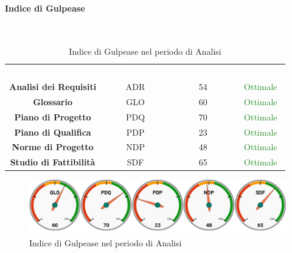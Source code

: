 \paragraph{Indice di Gulpease}\mbox{}\\[0,3cm]
\begin{table}[H]
	\centering
	\begin{tabular}{cccc}
	\rowcolor{greySWEight}
	\textcolor{white}{\textbf{Documento}} & 
	\textcolor{white}{\textbf{Abbreviazione}} &
	\textcolor{white}{\textbf{Valore Indice}}&
	\textcolor{white}{\textbf{Riscontro}}\\
	
	\textbf{Analisi dei Requisiti} &
	ADR & 
	54 &
	\textcolor{ForestGreen}{Ottimale}
	\\
	\textbf{Glossario} &
	GLO &
	60 &
	\textcolor{ForestGreen}{Ottimale}
	\\	
	\textbf{Piano di Progetto} &
	PDQ &
	70 &
	\textcolor{ForestGreen}{Ottimale}
	\\
	\textbf{Piano di Qualifica} &
	 PDP &
	 23 &
	 \textcolor{ForestGreen}{Ottimale}
	\\
	\textbf{Norme di Progetto} &
	NDP &
	48 &
	\textcolor{ForestGreen}{Ottimale}
	\\
	\textbf{Studio di Fattibilità} &
	SDF &
	65&
	\textcolor{ForestGreen}{Ottimale}
	\\
	\end{tabular}
	\caption{Indice di Gulpease nel periodo di Analisi}
\end{table}
\begin{figure}[H]
	\includegraphics[width=1\linewidth]{sez/App_Esito/graph/AN_Gulp.pdf}
	\caption{Indice di Gulpease nel periodo di Analisi}
\end{figure}

